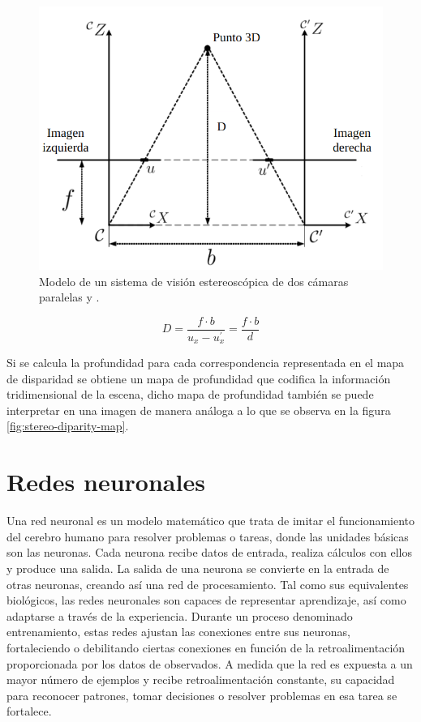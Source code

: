 \begin{figure}[H]
    \centering
    \includegraphics[scale=0.4]{partes/ImgJoao/stereo-trangulation.png}
    \caption[Modelo de un sistema de visión estereoscópica de dos cámaras paralelas  y .]{Modelo de un sistema de visión estereoscópica de dos cámaras paralelas  y \footnotemark.}
    \label{fig:stereo-triang}
\end{figure}

\begin{equation}
    \label{eq:stereo-depth}
    D =  \frac{f \cdot b}{u_x - u^{\prime}_x} = \frac{f \cdot b}{d}
\end{equation}

Si se calcula la profundidad  para cada correspondencia representada en el mapa de disparidad se obtiene un mapa de profundidad que codifica la información tridimensional de la escena, dicho mapa de profundidad también se puede interpretar en una imagen de manera análoga a lo que se observa en la figura \ref{fig:stereo-diparity-map}.

\section{Redes neuronales}
\label{sec:teo-neural}

Una red neuronal es un modelo matemático que trata de imitar el funcionamiento del cerebro humano para resolver problemas o tareas, donde las unidades básicas son las neuronas. Cada neurona recibe datos de entrada, realiza cálculos con ellos y produce una salida. La salida de una neurona se convierte en la entrada de otras neuronas, creando así una red de procesamiento. Tal como sus equivalentes biológicos, las redes neuronales son capaces de representar aprendizaje, así como adaptarse a través de la experiencia. Durante un proceso denominado entrenamiento, estas redes ajustan las conexiones entre sus neuronas, fortaleciendo o debilitando ciertas conexiones en función de la retroalimentación proporcionada por los datos de observados. A medida que la red es expuesta a un mayor número de ejemplos y recibe retroalimentación constante, su capacidad para reconocer patrones, tomar decisiones o resolver problemas en esa tarea se fortalece.

